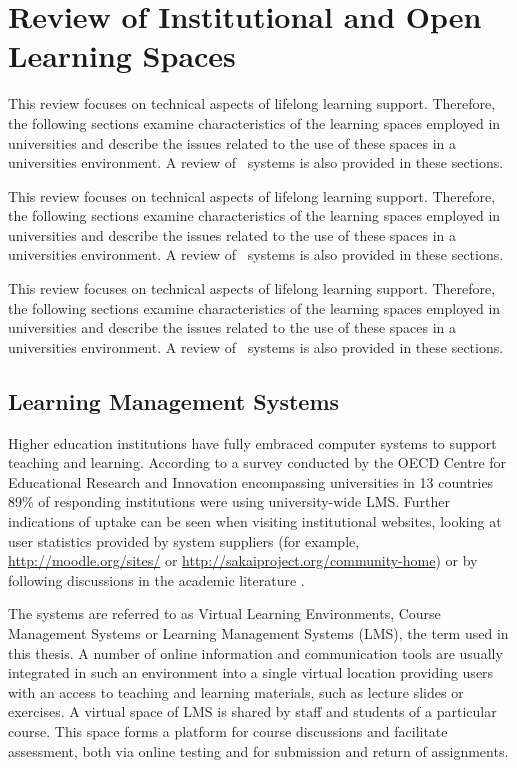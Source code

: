 \chapter{Review of Institutional and Open Learning Spaces \label{cha:systudy}}

This review focuses on technical aspects of lifelong learning support.
Therefore, the following sections examine characteristics of the learning spaces
employed in universities and describe the issues related to the use of these
spaces in a universities environment. A review of \ep~systems is also
provided in these sections.

This review focuses on technical aspects of lifelong learning support.
Therefore, the following sections examine characteristics of the learning spaces
employed in universities and describe the issues related to the use of these
spaces in a universities environment. A review of \ep~systems is also
provided in these sections.

This review focuses on technical aspects of lifelong learning support.
Therefore, the following sections examine characteristics of the learning spaces
employed in universities and describe the issues related to the use of these
spaces in a universities environment. A review of \ep~systems is also
provided in these sections.

\section{Learning Management Systems}
Higher education institutions have fully embraced computer systems to support
teaching and learning. According to a survey conducted by the OECD Centre for
Educational Research and Innovation encompassing universities in 13 countries
89\% of responding institutions were using university-wide LMS. Further
indications of uptake can be seen when visiting institutional websites, looking
at user statistics provided by system suppliers (for example,
\url{http://moodle.org/sites/} or
\url{http://sakaiproject.org/community-home}) or by following discussions in
the academic literature \citep{Browne2006,Collis2004}.

The systems are referred to as Virtual Learning Environments, Course Management
Systems or Learning Management Systems (LMS), the term used in this thesis. A
number of online information and communication tools are usually integrated in
such an environment into a single virtual location \citep{Morgan-Klein2007}
providing users with an access to teaching and learning materials, such as
lecture slides or exercises. A virtual space of LMS is shared by staff and
students of a particular course. This space forms a platform for course
discussions and facilitate assessment, both via online testing and for
submission and return of assignments.

